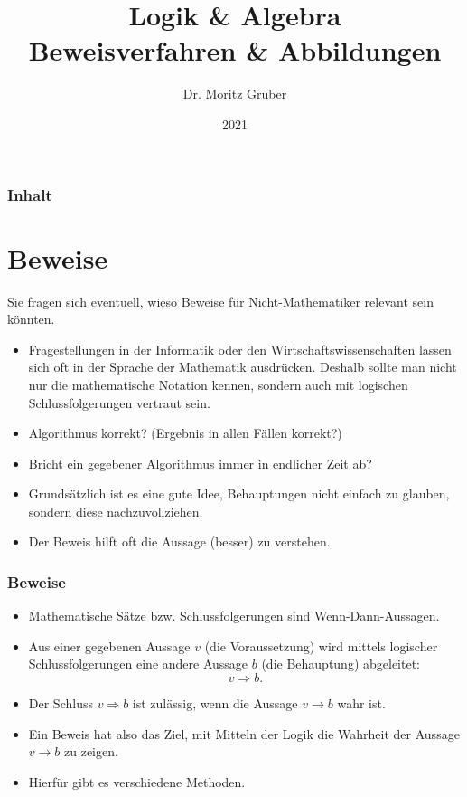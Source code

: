 \documentclass[
				hyperref={pdftex,
						breaklinks,
						pdfauthor={Andreas Weber},
						pdftitle={Logik und Algebra},
						colorlinks=true,
						urlcolor=blue,
						linkcolor=		%
				},
				xcolor=dvipsnames
			]
			{beamer}
\title{Logik \& Algebra\\[3mm] 
	\large Beweisverfahren \& Abbildungen
}
\author{Dr. Moritz Gruber}
\institute{DHBW Karlsruhe}
\date{2021}
\begin{document}


%
\begin{frame}[plain] 
 \titlepage
\end{frame}
%
%
\begin{frame}\frametitle{Inhalt}
   \tableofcontents
\end{frame}
%
\section{Beweise}
%
\begin{frame}

	Sie fragen sich eventuell, wieso Beweise f\"ur Nicht-Mathematiker relevant sein k\"onnten.\\
	\pause
	
	\begin{itemize}
		\item Fragestellungen in der Informatik oder den Wirtschafts\-wissenschaften lassen sich oft in der Sprache der Mathematik ausdr\"ucken.
		 	Deshalb sollte man nicht nur die mathematische Notation kennen, sondern auch mit logischen Schlussfolgerungen vertraut sein.
		\item Algorithmus korrekt? (Ergebnis in allen F\"allen  korrekt?)
		\item Bricht ein gegebener  Algorithmus immer in endlicher Zeit ab?
		\item Grunds\"atzlich ist es eine gute Idee, Behauptungen nicht einfach zu glauben, sondern diese nachzuvollziehen. 
		\item Der Beweis hilft oft die Aussage (besser) zu verstehen.
	\end{itemize}

\end{frame}
%
%
\begin{frame}\frametitle{Beweise}
	
	\begin{itemize}
		\item Mathematische S\"atze bzw. Schlussfolgerungen sind Wenn-Dann-Aussagen.
		\item Aus einer gegebenen Aussage $v$ (die Voraussetzung) wird mittels logischer Schlussfolgerungen eine andere Aussage 
			$b$ (die Behauptung) abgeleitet:
			$$
				v \Rightarrow b.
			$$
		\item Der Schluss $v \Rightarrow b$ ist zul\"assig, wenn die Aussage $v\rightarrow b$ wahr ist.
		\item Ein Beweis hat also das Ziel, mit Mitteln der Logik die Wahrheit der Aussage $v\rightarrow b$ zu zeigen.
		\item Hierf\"ur gibt es verschiedene Methoden.
	\end{itemize}
	
\end{frame}
%
\end{document}
